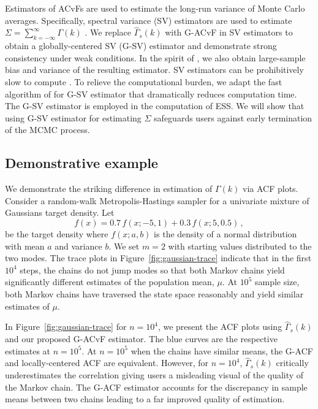 \documentclass[11pt]{article}
\theoremstyle{remark}
\newtheorem{example}{Example}
\begin{document}
Estimators of ACvFs are used to estimate the long-run variance of Monte Carlo averages. Specifically, spectral variance (SV) estimators  are used to estimate $\Sigma = \sum_{k=-\infty}^{\infty} \Gamma(k)$ \citep{andr:1991,dame:1991,fleg:jone:2010}. We replace $\hat{\Gamma}_s(k)$ with G-ACvF in SV estimators to obtain a globally-centered SV (G-SV) estimator and demonstrate strong consistency under weak conditions. In the spirit of \cite{andr:1991}, we also obtain large-sample bias and variance of the resulting estimator. SV estimators can be prohibitively slow to  compute \citep{liu:fleg:2018}. To relieve the computational burden, we adapt the fast algorithm of \cite{heberle2017fast} for G-SV estimator that dramatically reduces computation time. The G-SV estimator  is employed in the computation of ESS. We will show that using G-SV estimator for estimating $\Sigma$ safeguards users against early termination of the MCMC process.

\subsection{Demonstrative example} %
\label{sub:demonstrative_example}


We demonstrate the striking difference in estimation of $\Gamma(k)$ via ACF plots. Consider a random-walk Metropolis-Hastings sampler for a univariate mixture of Gaussians target density. Let
\[
f(x) = 0.7\,f(x; -5, 1) + 0.3\,f(x; 5, 0.5)\,,
\]
be the target density where $f(x; a,b)$ is the density of a normal distribution with mean $a$ and variance $b$. 
We set $m = 2$ with starting values distributed to the two modes. The trace plots in Figure~\ref{fig:gaussian-trace} indicate that in the first $10^4$ steps, the chains do not jump modes so that both Markov chains yield significantly different estimates of the population mean, $\mu$. At $10^5$ sample size, both Markov chains have traversed the state space reasonably and yield similar estimates of $\mu$. 

In Figure~\ref{fig:gaussian-trace} for $n = 10^4$, we present the ACF plots using $\hat{\Gamma}_s(k)$ and our proposed G-ACvF estimator. The blue curves are the respective estimates at $n = 10^5$. At $n = 10^5$ when the chains have similar means, the G-ACF and locally-centered ACF are equivalent.  However, for $n = 10^4$, $\hat{\Gamma}_s(k)$ critically underestimates the correlation giving users a misleading visual of the quality of the Markov chain. 
The G-ACF estimator accounts for the discrepancy in sample means between two chains leading to a far improved quality of estimation.
\end{document}
